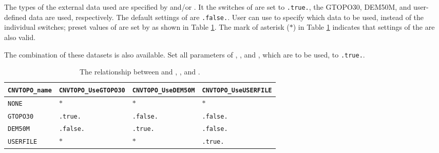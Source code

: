 The types of the external data used are specified by  and/or .
It the switches of  are set to \verb|.true.|, the GTOPO30, DEM50M, and user-defined data are used, respectively.
The default settings of  are \verb|.false.|.
User can use  to specify which data to be used, instead of the individual switches;
preset values of  are set by  as shown in Table \ref{tab:cvntopo_name}.
The mark of asterisk ($\ast$) in Table \ref{tab:cvntopo_name} indicates that
settings of the  are also valid.

The combination of these datasets is also available.
Set all parameters of , , and , which are to be used, to \verb|.true.|.

\begin{table}[tbh]
\begin{center}
\caption{The relationship between  and , , and .}
\begin{tabularx}{150mm}{X|l|l|l} \hline
  \rowcolor[gray]{0.9} \verb|CNVTOPO_name| & \verb|CNVTOPO_UseGTOPO30| & \verb|CNVTOPO_UseDEM50M| & \verb|CNVTOPO_UseUSERFILE| \\ \hline
                       \verb|NONE|           & $\ast$         & $\ast$         & $\ast$          \\ \hline
                       \verb|GTOPO30|        & \verb|.true.|  & \verb|.false.| & \verb|.false.|  \\ \hline
                       \verb|DEM50M|         & \verb|.false.| & \verb|.true.|  & \verb|.false.|  \\ \hline
                       \verb|USERFILE|       & $\ast$         & $\ast$         & \verb|.true.|   \\ \hline
\end{tabularx}
\label{tab:cvntopo_name}
\end{center}
\end{table}



